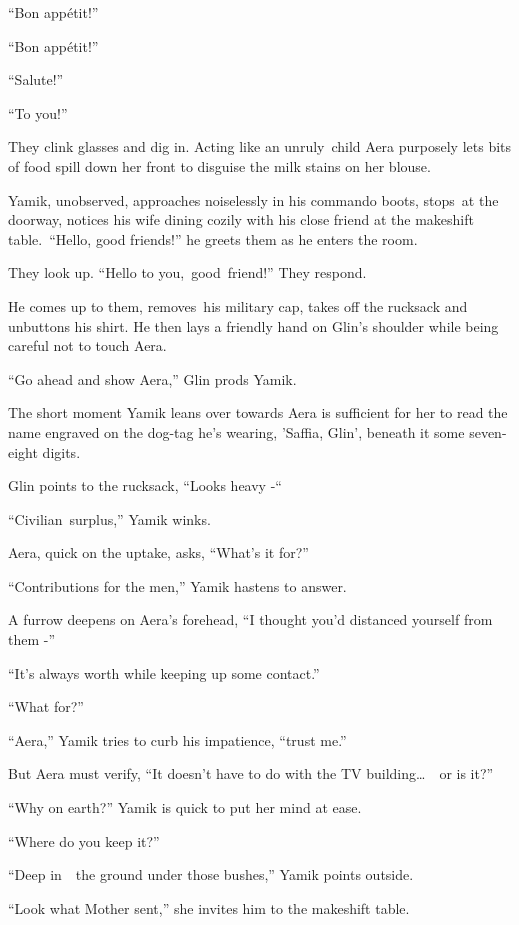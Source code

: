 \documentclass[twoside,11pt]{book}
\begin{document}
``Bon app\'etit!'' 

``Bon app\'etit!'' 

``Salute!'' 

``To you!'' 

They clink glasses and dig in. Acting like an unruly\ child Aera purposely lets bits of food spill down her front to
disguise the milk stains on her blouse.\ 

Yamik, unobserved, approaches noiselessly in his commando boots, stops~at the doorway, notices his wife dining cozily
with his close friend at the makeshift table.\ ``Hello, good friends!'' he greets them as he
enters the room. ~

They look up. ``Hello to you,{\ }good{\ }friend!'' They respond.

He comes up to them, removes{\ }his military cap, takes off the rucksack and
unbuttons his shirt. He then lays a friendly hand on Glin's shoulder while being careful not to touch Aera.

``Go ahead and show Aera,'' Glin prods Yamik.

The short moment Yamik leans over towards Aera is sufficient for her to read the name engraved on the
dog{{}-}tag he's wearing, 'Saffia, Glin', beneath it some seven-eight digits. 

Glin points to the rucksack, ``Looks heavy -``~ 

``Civilian~surplus,'' Yamik winks. 

Aera, quick on the uptake, asks, ``What's it for?'' 

``Contributions for the men,'' Yamik hastens to answer. 

A furrow deepens on Aera's forehead, ``I thought you'd distanced yourself from them -'' 

``It's always worth while keeping up some contact.'' 

``What for?'' 

``Aera,'' Yamik tries to curb his impatience, ``trust me.'' 

But Aera must verify, ``It doesn't have to do with the TV building{\dots}\ \ or is it?'' 

``Why on earth?'' Yamik is quick to put her mind at ease. ~

``Where do you keep it?'' 

``Deep in\ \ the ground under those bushes,'' Yamik points outside.

``Look what Mother sent,'' she invites him to the makeshift table. 
\end{document}
